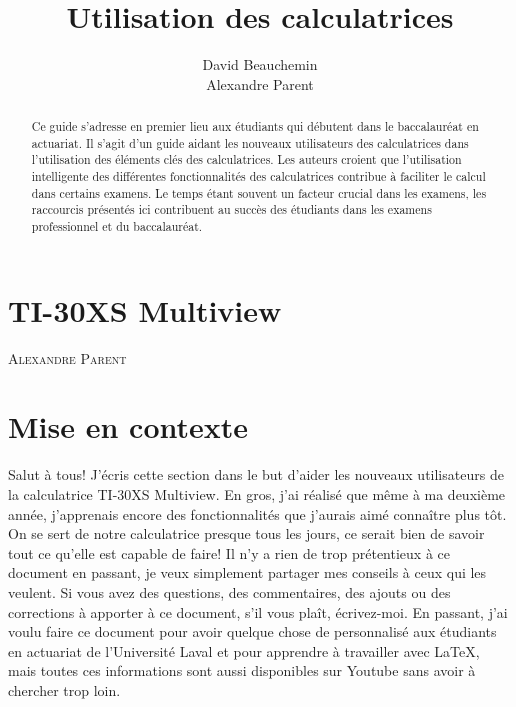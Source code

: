 \documentclass[french]{article}
\title{\vspace{2cm}
  \LARGE
  \textbf{Utilisation des calculatrices}
  \normalsize
  \vspace{6cm}}
\author{David Beauchemin \\ 
  \vspace{2cm} Alexandre Parent \vspace{2cm}}
\makeatletter
\newcommand{\chapterauthor}[1]{%
  {\parindent0pt\vspace*{-15pt}%
  \linespread{1.1}\large\scshape#1%
  \par\nobreak\vspace*{35pt}}
  \@afterheading%
}
\makeatother
\begin{document}
\maketitle

\newpage

\newpage

\begin{abstract}
Ce guide s'adresse en premier lieu aux étudiants qui débutent dans le baccalauréat en actuariat. Il s'agit d'un guide aidant les nouveaux utilisateurs des calculatrices dans l'utilisation des éléments clés des calculatrices. Les auteurs croient que l'utilisation intelligente des différentes fonctionnalités des calculatrices contribue à faciliter le calcul dans certains examens. Le temps étant souvent un facteur crucial dans les examens, les raccourcis présentés ici contribuent au succès des étudiants dans les examens professionnel et du baccalauréat.
{\tiny} 
\end{abstract}

\newpage
\tableofcontents

\setlength{\parskip}{1.8ex}


\pagebreak

\section{TI-30XS Multiview}
\chapterauthor{Alexandre Parent}

\section*{Mise en contexte}
Salut à tous! J'écris cette section dans le but d'aider les nouveaux utilisateurs de la calculatrice TI-30XS Multiview. En gros, j'ai réalisé que même à ma deuxième année, j'apprenais encore des fonctionnalités que j'aurais aimé connaître plus tôt. On se sert de notre calculatrice presque tous les jours, ce serait bien de savoir tout ce qu'elle est capable de faire! Il n'y a rien de trop prétentieux à ce document en passant, je veux simplement partager mes conseils à ceux qui les veulent. Si vous avez des questions, des commentaires, des ajouts ou des corrections à apporter à ce document, s'il vous plaît, écrivez-moi. En passant, j'ai voulu faire ce document pour avoir quelque chose de personnalisé aux étudiants en actuariat de l'Université Laval et pour apprendre à travailler avec LaTeX, mais toutes ces informations sont aussi disponibles sur Youtube sans avoir à chercher trop loin.
\end{document}
